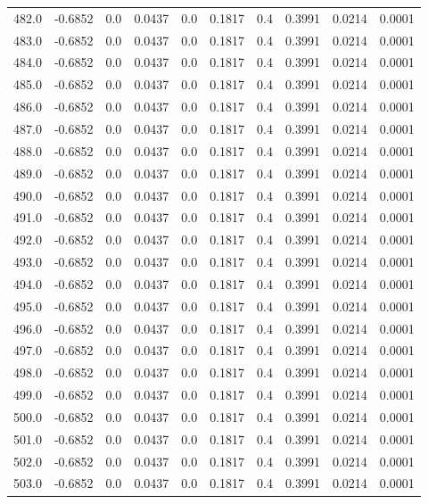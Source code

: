 \begin{longtable}{lrrrrrrrrr}
482.0 & -0.6852 & 0.0 & 0.0437 & 0.0 & 0.1817 & 0.4 & 0.3991 & 0.0214 & 0.0001 \\
483.0 & -0.6852 & 0.0 & 0.0437 & 0.0 & 0.1817 & 0.4 & 0.3991 & 0.0214 & 0.0001 \\
484.0 & -0.6852 & 0.0 & 0.0437 & 0.0 & 0.1817 & 0.4 & 0.3991 & 0.0214 & 0.0001 \\
485.0 & -0.6852 & 0.0 & 0.0437 & 0.0 & 0.1817 & 0.4 & 0.3991 & 0.0214 & 0.0001 \\
486.0 & -0.6852 & 0.0 & 0.0437 & 0.0 & 0.1817 & 0.4 & 0.3991 & 0.0214 & 0.0001 \\
487.0 & -0.6852 & 0.0 & 0.0437 & 0.0 & 0.1817 & 0.4 & 0.3991 & 0.0214 & 0.0001 \\
488.0 & -0.6852 & 0.0 & 0.0437 & 0.0 & 0.1817 & 0.4 & 0.3991 & 0.0214 & 0.0001 \\
489.0 & -0.6852 & 0.0 & 0.0437 & 0.0 & 0.1817 & 0.4 & 0.3991 & 0.0214 & 0.0001 \\
490.0 & -0.6852 & 0.0 & 0.0437 & 0.0 & 0.1817 & 0.4 & 0.3991 & 0.0214 & 0.0001 \\
491.0 & -0.6852 & 0.0 & 0.0437 & 0.0 & 0.1817 & 0.4 & 0.3991 & 0.0214 & 0.0001 \\
492.0 & -0.6852 & 0.0 & 0.0437 & 0.0 & 0.1817 & 0.4 & 0.3991 & 0.0214 & 0.0001 \\
493.0 & -0.6852 & 0.0 & 0.0437 & 0.0 & 0.1817 & 0.4 & 0.3991 & 0.0214 & 0.0001 \\
494.0 & -0.6852 & 0.0 & 0.0437 & 0.0 & 0.1817 & 0.4 & 0.3991 & 0.0214 & 0.0001 \\
495.0 & -0.6852 & 0.0 & 0.0437 & 0.0 & 0.1817 & 0.4 & 0.3991 & 0.0214 & 0.0001 \\
496.0 & -0.6852 & 0.0 & 0.0437 & 0.0 & 0.1817 & 0.4 & 0.3991 & 0.0214 & 0.0001 \\
497.0 & -0.6852 & 0.0 & 0.0437 & 0.0 & 0.1817 & 0.4 & 0.3991 & 0.0214 & 0.0001 \\
498.0 & -0.6852 & 0.0 & 0.0437 & 0.0 & 0.1817 & 0.4 & 0.3991 & 0.0214 & 0.0001 \\
499.0 & -0.6852 & 0.0 & 0.0437 & 0.0 & 0.1817 & 0.4 & 0.3991 & 0.0214 & 0.0001 \\
500.0 & -0.6852 & 0.0 & 0.0437 & 0.0 & 0.1817 & 0.4 & 0.3991 & 0.0214 & 0.0001 \\
501.0 & -0.6852 & 0.0 & 0.0437 & 0.0 & 0.1817 & 0.4 & 0.3991 & 0.0214 & 0.0001 \\
502.0 & -0.6852 & 0.0 & 0.0437 & 0.0 & 0.1817 & 0.4 & 0.3991 & 0.0214 & 0.0001 \\
503.0 & -0.6852 & 0.0 & 0.0437 & 0.0 & 0.1817 & 0.4 & 0.3991 & 0.0214 & 0.0001 \\

\end{longtable}
